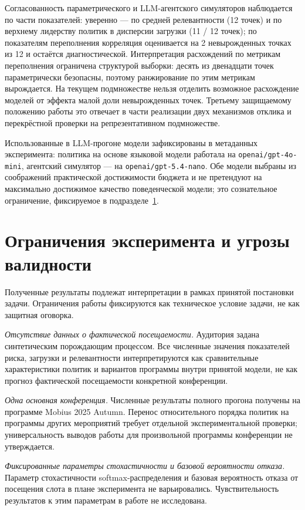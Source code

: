 Согласованность параметрического и LLM-агентского симуляторов наблюдается по части показателей: уверенно --- по средней релевантности (12 точек) и по верхнему лидерству политик в дисперсии загрузки (11 / 12 точек); по показателям переполнения корреляция оценивается на 2 невырожденных точках из 12 и остаётся диагностической. Интерпретация расхождений по метрикам переполнения ограничена структурой выборки: десять из двенадцати точек параметрически безопасны, поэтому ранжирование по этим метрикам вырождается. На текущем подмножестве нельзя отделить возможное расхождение моделей от эффекта малой доли невырожденных точек. Третьему защищаемому положению работы это отвечает в части реализации двух механизмов отклика и перекрёстной проверки на репрезентативном подмножестве.

Использованные в LLM-прогоне модели зафиксированы в метаданных эксперимента: политика на основе языковой модели работала на \texttt{openai/gpt-4o-mini}, агентский симулятор --- на \texttt{openai/gpt-5.4-nano}. Обе модели выбраны из соображений практической достижимости бюджета и не претендуют на максимально достижимое качество поведенческой модели; это сознательное ограничение, фиксируемое в подразделе~\ref{sec:4-8}.


\section{Ограничения эксперимента и угрозы валидности}
\label{sec:4-8}

Полученные результаты подлежат интерпретации в рамках принятой постановки задачи. Ограничения работы фиксируются как техническое условие задачи, не как защитная оговорка.

\textit{Отсутствие данных о фактической посещаемости.} Аудитория задана синтетическим порождающим процессом. Все численные значения показателей риска, загрузки и релевантности интерпретируются как сравнительные характеристики политик и вариантов программы внутри принятой модели, не как прогноз фактической посещаемости конкретной конференции.

\textit{Одна основная конференция.} Численные результаты полного прогона получены на программе Mobius 2025 Autumn. Перенос относительного порядка политик на программы других мероприятий требует отдельной экспериментальной проверки; универсальность выводов работы для произвольной программы конференции не утверждается.

\textit{Фиксированные параметры стохастичности и базовой вероятности отказа.} Параметр стохастичности softmax-распределения и базовая вероятность отказа от посещения слота в плане эксперимента не варьировались. Чувствительность результатов к этим параметрам в работе не исследована.

